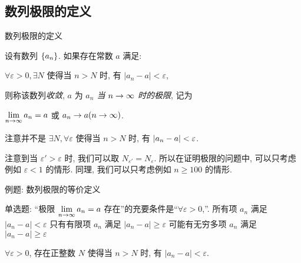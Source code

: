 \subsection{数列极限的定义}
\begin{frame}{数列极限的定义}
	\onslide<+->
	\begin{definition*}
		设有数列 ${\left\{a_n\right\}}$. 如果存在常数 $a$ 满足:
		\begin{center}
			\alert{$\forall\varepsilon>0, \exists N$ 使得当 $n>N$ 时, 有 $|a_n-a|<\varepsilon$},
		\end{center}
		则称该数列\emph{收敛}, $a$ 为 \emph{$a_n$ 当 $n \rightarrow \infty$ 时的极限}, 记为
		\begin{center}
			\emph{$\lim\limits_{n\rightarrow\infty}a_n=a$} 或 $a_n\rightarrow a (n\rightarrow \infty)$.
		\end{center}

	\end{definition*}
	\onslide<+->
	注意并不是 $\exists N,\forall\varepsilon$ 使得当 $n>N$ 时, 有 $\left|a_n-a\right|<\varepsilon$.
	
	\onslide<+->
	注意到当 $\varepsilon'>\varepsilon$ 时, 我们可以取 $N_{\varepsilon'}=N_\varepsilon$.
	\onslide<+->
	所以在证明极限的问题中, 可以只考虑例如 $\varepsilon<1$ 的情形.
	\onslide<+->
	同理, 我们可以只考虑例如 $n\ge 100$ 的情形.
\end{frame}


\begin{frame}{例题: 数列极限的等价定义}
	\onslide<+->
	\begin{example}
		单选题: “极限 $\lim\limits_{n\rightarrow\infty}a_n=a$ 存在”的充要条件是“$\forall\varepsilon>0$,”.
		{所有项 $a_n$ 满足 $|a_n-a|<\varepsilon$}
		{只有有限项 $a_n$ 满足 $|a_n-a|\ge \varepsilon$}
		{可能有无穷多项 $a_n$ 满足 $|a_n-a|\ge \varepsilon$}
	\end{example}
	\onslide<+->
	\begin{solution}
		$\forall\varepsilon>0$, 存在正整数 $N$ 使得当 $n>N$ 时, 有 $|a_n-a|<\varepsilon$.
		\onslide<+->{对于 A , 反例 $a_n=(-1)^n, a=1$.}
	\end{solution}
\end{frame}



